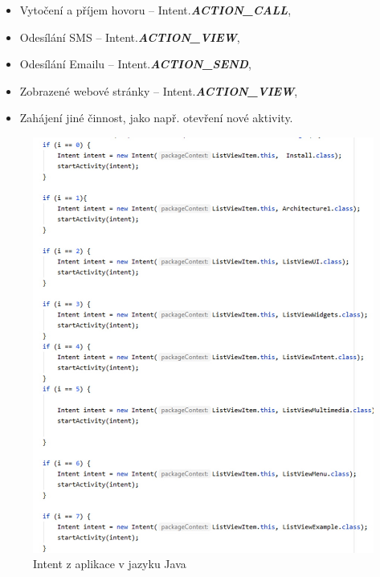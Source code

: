 \documentclass{vskpou} %
\begin{document}
\begin{itemize}
          \begin{itemize}
        \item Vytočení a příjem hovoru -- Intent.\textit{\textbf{ACTION\_CALL}},
        \item Odesílání SMS -- Intent.\textit{\textbf{ACTION\_VIEW}},
        \item Odesílání Emailu -- Intent.\textit{\textbf{ACTION\_SEND}},
        \item Zobrazené webové stránky -- Intent.\textit{\textbf{ACTION\_VIEW}},
        \item Zahájení jiné činnost, jako např. otevření nové aktivity.
        \end{itemize}
     \newpage
          \begin{figure}[h!]
        \centering
        \includegraphics[scale=0.4]{images/26.jpg}
        \caption{Intent z aplikace v jazyku Java}
        \label{26}
        \end{figure}
        \newpage
        \begin{figure}[h!]
        \centering

\end{figure}
\end{itemize}
\end{document}
